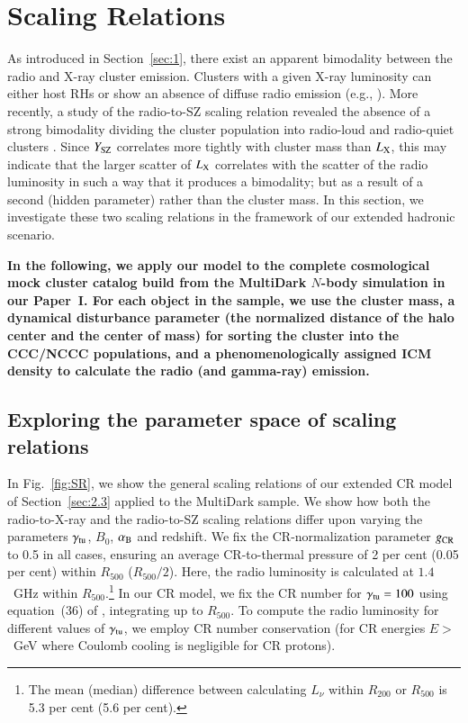 \documentclass[useAMS,usenatbib]{mn2e}
\begin{document}
\section{Scaling Relations}
\label{sec:4}
As introduced in Section~\ref{sec:1}, there exist an apparent bimodality between
the radio and X-ray cluster emission. Clusters with a given X-ray luminosity can
either host RHs or show an absence of diffuse radio emission (e.g.,
\citealp{2009A&A...507..661B,2011A&A...527A..99E}). More recently, a study of
the radio-to-SZ scaling relation revealed the absence of a strong bimodality
dividing the cluster population into radio-loud and radio-quiet clusters
\citep{2012MNRAS.421L.112B,2013arXiv1306.4379C,2013arXiv1307.3049S}.  Since
$Y_{{\mathrm{SZ}}}$ correlates more tightly with cluster mass than $L_{{\mathrm{X}}}$,
this may indicate that the larger scatter of $L_{{\mathrm{X}}}$ correlates with the
scatter of the radio luminosity in such a way that it produces a bimodality; but
as a result of a second (hidden parameter) rather than the cluster mass. In this
section, we investigate these two scaling relations in the framework of our
extended hadronic scenario.

{\bf In the following, we apply our model to the complete cosmological mock
  cluster catalog build from the MultiDark $N$-body simulation in our
  Paper~I. For each object in the sample, we use the cluster mass, a dynamical
  disturbance parameter (the normalized distance of the halo center and the
  center of mass) for sorting the cluster into the CCC/NCCC populations, and a
  phenomenologically assigned ICM density to calculate the radio (and gamma-ray)
  emission.}


\subsection{Exploring the parameter space of scaling relations}

In Fig.~\ref{fig:SR}, we show the general scaling relations of our extended CR
model of Section~\ref{sec:2.3} applied to the MultiDark sample. We show how both
the radio-to-X-ray and the radio-to-SZ scaling relations differ upon varying the
parameters $\gamma_{{\mathrm{tu}}}$, $B_{0}$, $\alpha_{{\mathrm{B}}}$ and redshift. We fix
the CR-normalization parameter $g_{{\mathrm{CR}}}$ to 0.5 in all cases, ensuring an
average CR-to-thermal pressure of 2 per cent (0.05 per cent) within $R_{500}$
($R_{500}/2$). Here, the radio luminosity is calculated at $1.4$~GHz within
$R_{500}.$\footnote{The mean (median) difference between calculating $L_{\nu}$
  within $R_{200}$ or $R_{500}$ is 5.3 per cent (5.6 per cent).}  In our CR
model, we fix the CR number for $\gamma_{{\mathrm{tu}}}=100$ using equation~(36) of
\cite{2011A&A...527A..99E}, integrating up to $R_{500}$. To compute the radio
luminosity for different values of $\gamma_{{\mathrm{tu}}}$, we employ CR number
conservation (for CR energies $E>$~GeV where Coulomb cooling is negligible for
CR protons).
\end{document}
